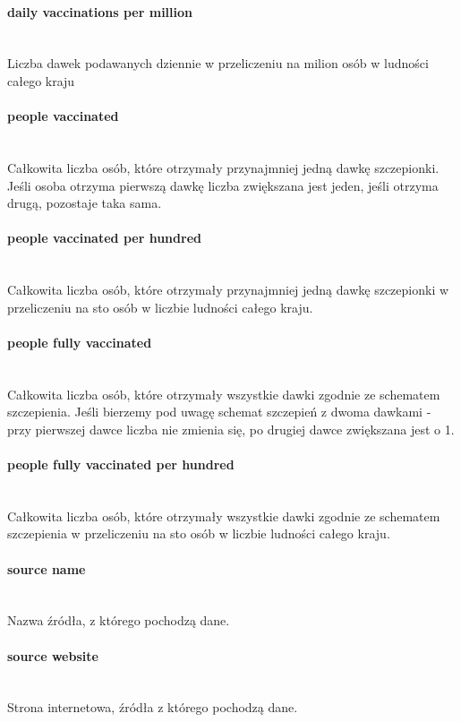 \documentclass[12pt, oneside]{article}
\begin{document}
\paragraph{daily vaccinations per million}
\mbox{}\\
Liczba dawek podawanych dziennie w przeliczeniu na milion osób w ludności całego
kraju

\paragraph{people vaccinated}
\mbox{}\\
Całkowita liczba osób, które otrzymały przynajmniej jedną dawkę szczepionki. Jeśli
osoba otrzyma pierwszą dawkę liczba zwiększana jest jeden, jeśli otrzyma drugą, pozostaje taka sama.

\paragraph{people vaccinated per hundred}
\mbox{}\\
Całkowita liczba osób, które otrzymały przynajmniej jedną dawkę szczepionki w przeliczeniu na sto osób w liczbie ludności całego kraju.

\paragraph{people fully vaccinated}
\mbox{}\\
Całkowita liczba osób, które otrzymały wszystkie dawki zgodnie ze schematem szczepienia. Jeśli bierzemy pod uwagę schemat szczepień z dwoma dawkami - przy pierwszej
dawce liczba nie zmienia się, po drugiej dawce zwiększana jest o 1.

\paragraph{people fully vaccinated per hundred}
\mbox{}\\
Całkowita liczba osób, które otrzymały wszystkie dawki zgodnie ze schematem szczepienia w przeliczeniu na sto osób w liczbie ludności całego kraju.

\paragraph{source name}
\mbox{}\\
Nazwa źródła, z którego pochodzą dane.

\paragraph{source website}
\mbox{}\\
Strona internetowa, źródła z którego pochodzą dane.
\end{document}
